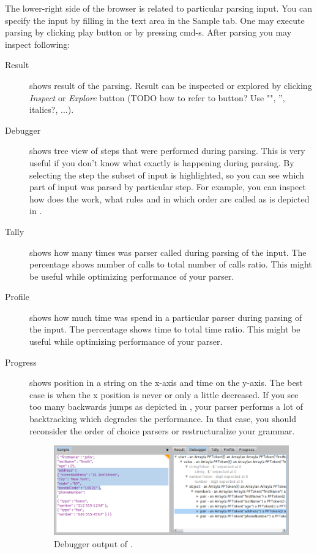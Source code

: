 \documentclass[a4paper,10pt,twoside]{book}
\begin{document}
\noindent The lower-right side of the browser is related to particular parsing input.
You can specify the input by filling in the text area in the Sample tab.
One may execute parsing by clicking play button or by pressing cmd-s. 
After parsing you may inspect following:
\begin{description}
	\item [Result] shows result of the parsing. 
		Result can be inspected or explored by clicking \textit{Inspect} or \textit{Explore} button (TODO how to refer to button? Use "", '', italics?, ...).
	\item [Debugger] shows tree view of steps that were performed during parsing.
		This is very useful if you don't know what exactly is happening during parsing.
		By selecting the step the subset of input is highlighted, so you can see which part of input was parsed by particular step.
		For example, you can inspect how does the  work, what rules and in which order are called as is depicted in .
	\item [Tally] shows how many times was parser called during parsing of the input.
		The percentage shows number of calls to total number of calls ratio.
		This might be useful while optimizing performance of your parser.
	\item [Profile] shows how much time was spend in a particular parser during parsing of the input.
		The percentage shows time to total time ratio.
		This might be useful while optimizing performance of your parser.
	\item [Progress] shows position in a string on the x-axis and time on the y-axis.
		The best case is when the x position is never or only a little decreased.
		If you see too many backwards jumps \eg as depicted in , your parser performs a lot of backtracking which degrades the performance.
		In that case, you should reconsider the order of choice parsers or restructuralize your grammar.

\begin{figure}
  \begin{center}
    \includegraphics[width=\linewidth]{PPBrowserDebugger}
    \caption{Debugger output of . \label{fig:pp/debugger}}
  \end{center}
\end{figure}


\end{description}
\end{document}

